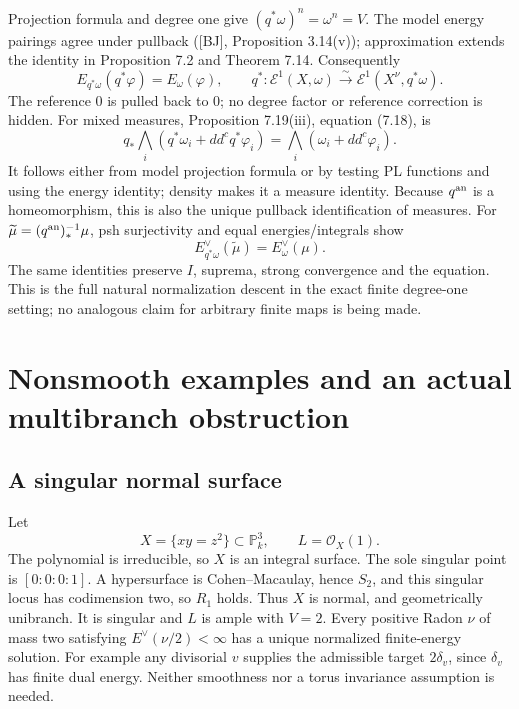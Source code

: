 \documentclass[11pt]{article}
\begin{document}
Projection formula and degree one give \((q^*\omega)^n=\omega^n=V\). The
model energy pairings agree under pullback ({[}BJ{]}, Proposition
3.14(v)); approximation extends the identity in Proposition 7.2 and
Theorem 7.14. Consequently
\[E_{q^*\omega}(q^*\varphi)=E_\omega(\varphi),\qquad
q^*:\mathcal E^1(X,\omega)\xrightarrow{\sim}\mathcal E^1(X^\nu,q^*\omega).\]
The reference \(0\) is pulled back to \(0\); no degree factor or
reference correction is hidden. For mixed measures, Proposition
7.19(iii), equation (7.18), is
\[q_*\bigwedge_i(q^*\omega_i+dd^cq^*\varphi_i)
=\bigwedge_i(\omega_i+dd^c\varphi_i).\] It follows either from model
projection formula or by testing PL functions and using the energy
identity; density makes it a measure identity. Because \(q^{\rm an}\) is
a homeomorphism, this is also the unique pullback identification of
measures. For \(\widetilde\mu=(q^{\rm an})^{-1}_*\mu\), psh surjectivity
and equal energies/integrals show
\[E^\vee_{q^*\omega}(\widetilde\mu)=E^\vee_\omega(\mu).\] The same
identities preserve \(I\), suprema, strong convergence and the equation.
This is the full natural normalization descent in the exact finite
degree-one setting; no analogous claim for arbitrary finite maps is
being made.

\section{Nonsmooth examples and an actual multibranch
obstruction}\label{nonsmooth-examples-and-an-actual-multibranch-obstruction}

\subsection{A singular normal surface}\label{a-singular-normal-surface}

Let \[X=\{xy=z^2\}\subset\mathbb P^3_k,\qquad L=\mathcal O_X(1).\] The
polynomial is irreducible, so \(X\) is an integral surface. The sole
singular point is \([0:0:0:1]\). A hypersurface is Cohen--Macaulay,
hence \(S_2\), and this singular locus has codimension two, so \(R_1\)
holds. Thus \(X\) is normal, and geometrically unibranch. It is singular
and \(L\) is ample with \(V=2\). Every positive Radon \(\nu\) of mass
two satisfying \(E^\vee(\nu/2)<\infty\) has a unique normalized
finite-energy solution. For example any divisorial \(v\) supplies the
admissible target \(2\delta_v\), since \(\delta_v\) has finite dual
energy. Neither smoothness nor a torus invariance assumption is needed.
\end{document}
